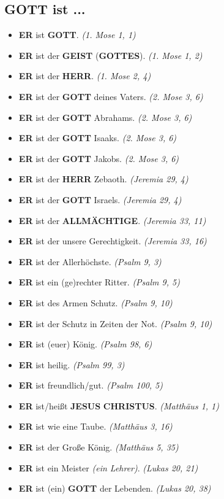 \documentclass[12pt,a5paper]{article}
\newcommand{\Allmaechtige}[0]{\textbf{ALLM\"ACHTIGE}}
\newcommand{\Christus}[0]{\textbf{CHRISTUS}}
\newcommand{\Er}[0]{\textbf{ER}}
\newcommand{\Geist}[0]{\textbf{GEIST}}
\newcommand{\Gottes}[0]{\textbf{GOTTES}}
\newcommand{\Gott}[0]{\textbf{GOTT}}
\newcommand{\Herr}[0]{\textbf{HERR}}
\newcommand{\Jesus}[0]{\textbf{JESUS}}
\begin{document}
	\subsection{{\Gott} ist ...}
		\begin{itemize}[nosep]
			\item {\Er} ist {\Gott}. \textit{(1. Mose 1, 1)}
			\item {\Er} ist der {\Geist} ({\Gottes}). \textit{(1. Mose 1, 2)}
			\item {\Er} ist der {\Herr}. \textit{(1. Mose 2, 4)}
			\item {\Er} ist der {\Gott} deines Vaters. \textit{(2. Mose 3, 6)}
			\item {\Er} ist der {\Gott} Abrahams. \textit{(2. Mose 3, 6)}
			\item {\Er} ist der {\Gott} Isaaks. \textit{(2. Mose 3, 6)}
			\item {\Er} ist der {\Gott} Jakobs. \textit{(2. Mose 3, 6)}
			\item {\Er} ist der {\Herr} Zebaoth. \textit{(Jeremia 29, 4)}
			\item {\Er} ist der {\Gott} Israels. \textit{(Jeremia 29, 4)}
			\item {\Er} ist der {\Allmaechtige}. \textit{(Jeremia 33, 11)}
			\item {\Er} ist der unsere Gerechtigkeit. \textit{(Jeremia 33, 16)}
			\item {\Er} ist der Allerh\"ochste. \textit{(Psalm 9, 3)}
			\item {\Er} ist ein (ge)rechter Ritter. \textit{(Psalm 9, 5)}
			\item {\Er} ist des Armen Schutz. \textit{(Psalm 9, 10)}
			\item {\Er} ist der Schutz in Zeiten der Not. \textit{(Psalm 9, 10)}
			\item {\Er} ist (euer) König. \textit{(Psalm 98, 6)}
			\item {\Er} ist heilig. \textit{(Psalm 99, 3)}
			\item {\Er} ist freundlich/gut. \textit{(Psalm 100, 5)}
			\item {\Er} ist/hei{\ss}t {\Jesus} {\Christus}. \textit{(Matth\"aus 1, 1)}
			\item {\Er} ist wie eine Taube. \textit{(Matth\"aus 3, 16)}
			\item {\Er} ist der Gro{\ss}e K\"onig. \textit{(Matth\"aus 5, 35)}
			\item {\Er} ist ein Meister \textit{(ein Lehrer)}. \textit{(Lukas 20, 21)}
			\item {\Er} ist (ein) {\Gott} der Lebenden. \textit{(Lukas 20, 38)}		

\end{itemize}
\end{document}
